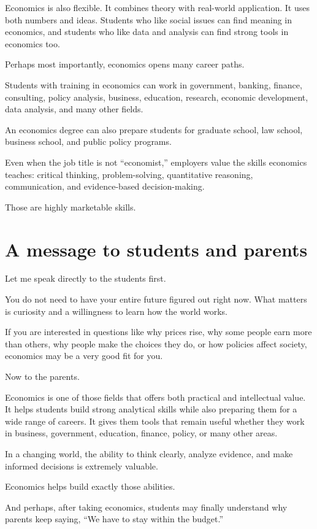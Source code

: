 \documentclass[12pt]{article}
\begin{document}
Economics is also flexible. It combines theory with real-world application. It uses both numbers and ideas. Students who like social issues can find meaning in economics, and students who like data and analysis can find strong tools in economics too.

Perhaps most importantly, economics opens many career paths.

Students with training in economics can work in government, banking, finance, consulting, policy analysis, business, education, research, economic development, data analysis, and many other fields.

An economics degree can also prepare students for graduate school, law school, business school, and public policy programs.

Even when the job title is not ``economist,'' employers value the skills economics teaches: critical thinking, problem-solving, quantitative reasoning, communication, and evidence-based decision-making.

Those are highly marketable skills.

\section*{A message to students and parents}

Let me speak directly to the students first.

You do not need to have your entire future figured out right now. What matters is curiosity and a willingness to learn how the world works.

If you are interested in questions like why prices rise, why some people earn more than others, why people make the choices they do, or how policies affect society, economics may be a very good fit for you.

Now to the parents.

Economics is one of those fields that offers both practical and intellectual value. It helps students build strong analytical skills while also preparing them for a wide range of careers. It gives them tools that remain useful whether they work in business, government, education, finance, policy, or many other areas.

In a changing world, the ability to think clearly, analyze evidence, and make informed decisions is extremely valuable.

Economics helps build exactly those abilities.

And perhaps, after taking economics, students may finally understand why parents keep saying, ``We have to stay within the budget.''
\end{document}
